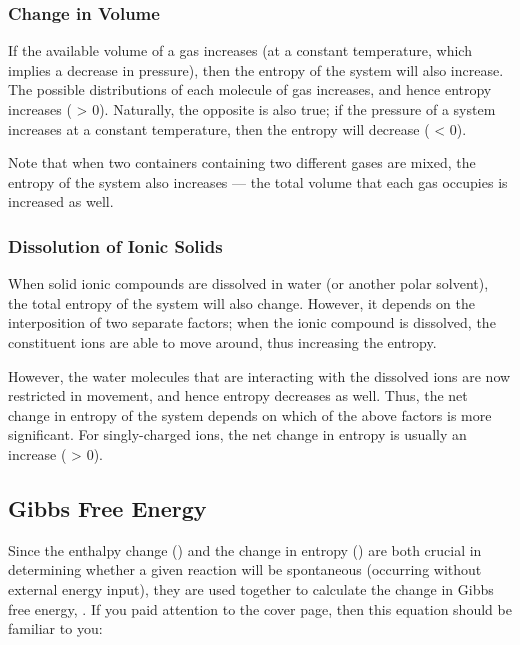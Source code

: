 
		\subsubsection{Change in Volume}

			If the available volume of a gas increases (at a constant temperature, which implies a decrease in pressure), then the entropy
			of the system will also increase. The possible distributions of each molecule of gas increases, and hence entropy increases
			(\entr{} > 0). Naturally, the opposite is also true; if the pressure of a system increases at a constant temperature, then the entropy
			will decrease (\entr{} < 0).

			Note that when two containers containing two different gases are mixed, the entropy of the system also increases --- the total
			volume that each gas occupies is increased as well.



		\pagebreak
		\subsubsection{Dissolution of Ionic Solids}

			When solid ionic compounds are dissolved in water (or another polar solvent), the total entropy of the system will also change.
			However, it depends on the interposition of two separate factors; when the ionic compound is dissolved, the constituent ions are
			able to move around, thus increasing the entropy.

			However, the water molecules that are interacting with the dissolved ions are now restricted in movement, and hence entropy decreases
			as well. Thus, the net change in entropy of the system depends on which of the above factors is more significant. For singly-charged
			ions, the net change in entropy is usually an increase (\entr{} > 0).




	\subsection{Gibbs Free Energy}

		Since the enthalpy change (\enth{}) and the change in entropy (\entr{}) are both crucial in determining whether a given reaction will
		be spontaneous (occurring without external energy input), they are used together to calculate the change in Gibbs free energy, \gibb{}.
		If you paid attention to the cover page, then this equation should be familiar to you:

